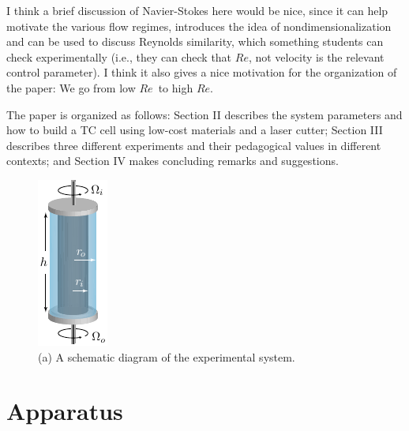 \documentclass[%
reprint,
 amsmath,amssymb,
 aps,
prb,
floatfix,
longbibliography,
notitlepage
]{revtex4-1}
\newcommand{\DB}[1]{{\color{red}#1}} %
\newcommand{\ReN}{\ensuremath{Re}} %
\begin{document}
\DB{I think a brief discussion of Navier-Stokes here would be nice, since it can help motivate the various flow regimes, introduces the idea of nondimensionalization and can be used to discuss Reynolds similarity, which something students can check experimentally (i.e., they can check that \ReN, not velocity is the relevant control parameter). I think it also gives a nice motivation for the organization of the paper: We go from low \ReN\ to high \ReN.}

The paper is organized as follows: Section II describes the system parameters and how to build a TC cell using low-cost materials and a laser cutter; Section III describes three different experiments and their pedagogical values in different contexts; and Section IV makes concluding remarks and suggestions.


\begin{figure}[ht]
  \centering
    \includegraphics[width=.15\columnwidth]{1_Apparatus.pdf}
    \caption{\label{fig:schematic}(a) A schematic diagram of the experimental system.}
\end{figure}

\section{Apparatus}
\end{document}
